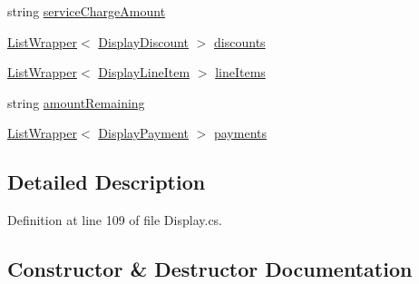 \begin{DoxyCompactItemize}
string \hyperlink{classcom_1_1clover_1_1remote_1_1order_1_1_display_order_ac7552b1b9fdb3341487eda25f97afa54}{service\+Charge\+Amount}
\item 
\hyperlink{classcom_1_1clover_1_1remote_1_1order_1_1_list_wrapper}{List\+Wrapper}$<$ \hyperlink{classcom_1_1clover_1_1remote_1_1order_1_1_display_discount}{Display\+Discount} $>$ \hyperlink{classcom_1_1clover_1_1remote_1_1order_1_1_display_order_a9dd7ba751d845232742aed1f8e790f38}{discounts}
\item 
\hyperlink{classcom_1_1clover_1_1remote_1_1order_1_1_list_wrapper}{List\+Wrapper}$<$ \hyperlink{classcom_1_1clover_1_1remote_1_1order_1_1_display_line_item}{Display\+Line\+Item} $>$ \hyperlink{classcom_1_1clover_1_1remote_1_1order_1_1_display_order_aa010f031e5410f1fc8c5707186cf6299}{line\+Items}
\item 
string \hyperlink{classcom_1_1clover_1_1remote_1_1order_1_1_display_order_ace29276b80eddfe16359e5ab11095292}{amount\+Remaining}
\item 
\hyperlink{classcom_1_1clover_1_1remote_1_1order_1_1_list_wrapper}{List\+Wrapper}$<$ \hyperlink{classcom_1_1clover_1_1remote_1_1order_1_1_display_payment}{Display\+Payment} $>$ \hyperlink{classcom_1_1clover_1_1remote_1_1order_1_1_display_order_ae15dac6d3ba1be59b437bb97f20af84f}{payments}
\end{DoxyCompactItemize}


\subsection{Detailed Description}


Definition at line 109 of file Display.\+cs.



\subsection{Constructor \& Destructor Documentation}
\mbox{\label{classcom_1_1clover_1_1remote_1_1order_1_1_display_order_a7b41c782040d1189e03221bd3cd12ce0}} 
